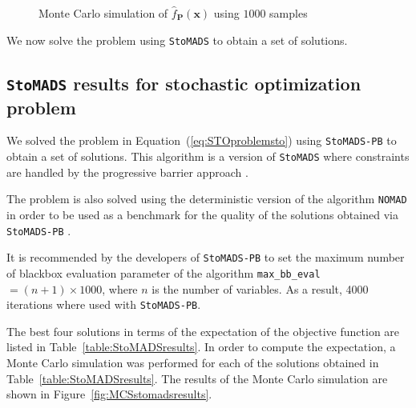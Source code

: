 \begin{figure}[h!]
	\centering
	

\end{figure}

\begin{figure}[h!]
	\ContinuedFloat %
	\caption{Monte Carlo simulation of $\hat{f}_{\mathbf{P}}(\mathbf{x})$ using $1000$ samples}
	\label{fig:MSCStoblackbox}
\end{figure}

We now solve the problem using \texttt{StoMADS} to obtain a set of solutions.

\subsection{\texttt{StoMADS} results for stochastic optimization problem} \label{subsec:STOMADSresults}

We solved the problem in Equation~(\ref{eq:STOproblemsto}) using \texttt{StoMADS-PB} to obtain a set of solutions. This algorithm is a version of \texttt{StoMADS} where constraints are handled by the progressive barrier approach \cite{Audet2009}.

The problem is also solved using the deterministic version of the algorithm \texttt{NOMAD} in order to be used as a benchmark for the quality of the solutions obtained via \texttt{StoMADS-PB} \cite{LeDigabel2011}. 

It is recommended by the developers of \texttt{StoMADS-PB} to set the maximum number of blackbox evaluation parameter of the algorithm \texttt{max\_bb\_eval}$ = (n+1) \times 1000$, where $n$ is the number of variables. As a result, 4000 iterations where used with \texttt{StoMADS-PB}.

The best four solutions in terms of the expectation of the objective function are listed in Table~\ref{table:StoMADSresults}. In order to compute the expectation, a Monte Carlo simulation was performed for each of the solutions obtained in Table~\ref{table:StoMADSresults}. The results of the Monte Carlo simulation are shown in Figure~\ref{fig:MCSstomadsresults}.

